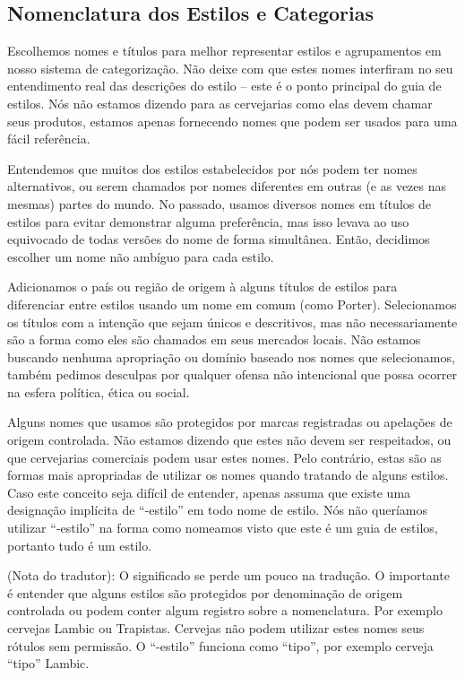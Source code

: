 \subsection*{Nomenclatura dos Estilos e Categorias}

Escolhemos nomes e títulos para melhor representar estilos e agrupamentos em nosso sistema de categorização.  Não deixe com que estes nomes interfiram no seu entendimento real das descrições do estilo – este é o ponto principal do guia de estilos. Nós não estamos dizendo para as cervejarias como elas devem chamar seus produtos, estamos apenas fornecendo nomes que podem ser usados para uma fácil referência.

Entendemos que muitos dos estilos estabelecidos por nós podem ter nomes alternativos, ou serem chamados por nomes diferentes em outras (e as vezes nas mesmas) partes do mundo. No passado, usamos diversos nomes em títulos de estilos para evitar demonstrar alguma preferência, mas isso levava ao uso equivocado de todas versões do nome de forma simultânea. Então, decidimos escolher um nome não ambíguo para cada estilo.

Adicionamos o país ou região de origem à alguns títulos de estilos para diferenciar entre estilos usando um nome em comum (como Porter). Selecionamos os títulos com a intenção que sejam únicos e descritivos, mas não necessariamente são a forma como eles são chamados em seus mercados locais. Não estamos buscando nenhuma apropriação ou domínio baseado nos nomes que selecionamos, também pedimos desculpas por qualquer ofensa não intencional que possa ocorrer na esfera política, ética ou social.

Alguns nomes que usamos são protegidos por marcas registradas ou apelações de origem controlada. Não estamos dizendo que estes não devem ser respeitados, ou que cervejarias comerciais podem usar estes nomes. Pelo contrário, estas são as formas mais apropriadas de utilizar os nomes quando tratando de alguns estilos. Caso este conceito seja difícil de entender, apenas assuma que existe uma designação implícita de “-estilo” em todo nome de estilo. Nós não queríamos utilizar “-estilo” na forma como nomeamos visto que este é um guia de estilos, portanto tudo é um estilo.

(Nota do tradutor): O significado se perde um pouco na tradução. O importante é entender que alguns estilos são protegidos por denominação de origem controlada ou podem conter algum registro sobre a nomenclatura. Por exemplo cervejas Lambic ou Trapistas. Cervejas não podem utilizar estes nomes seus rótulos sem permissão. O “-estilo” funciona como “tipo”, por exemplo cerveja “tipo” Lambic.